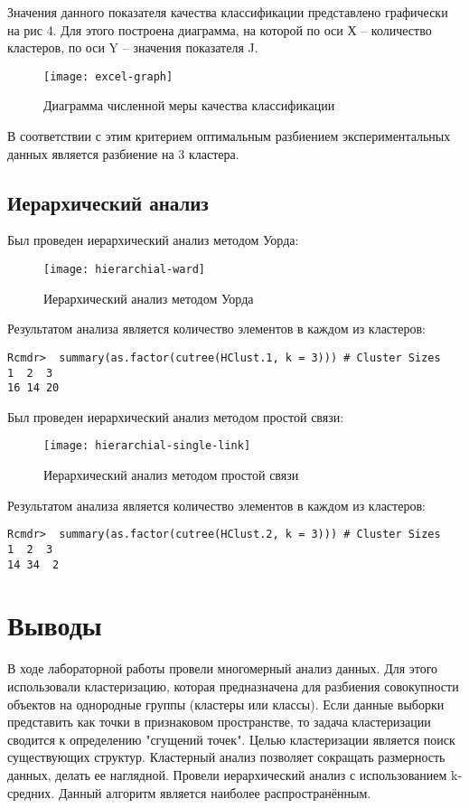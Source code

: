 \documentclass[a4paper,14pt]{extarticle}
\begin{document}
Значения данного показателя качества классификации представлено графически на
рис 4.  Для этого построена диаграмма, на которой по оси Х – количество
кластеров, по оси Y – значения показателя J.

\begin{figure}[H]
    \centering
    \texttt{[image: excel-graph]}
    \caption{Диаграмма численной меры качества классификации}
    \label{fig:excel-graph}
\end{figure}

В соответствии с этим критерием оптимальным разбиением экспериментальных данных
является разбиение на 3 кластера.

\subsection{Иерархический анализ}
Был проведен иерархический анализ методом Уорда:

\begin{figure}[H]
    \centering
    \texttt{[image: hierarchial-ward]}
    \caption{Иерархический анализ методом Уорда}
    \label{fig:hierarchial-ward}
\end{figure}

Результатом анализа является количество элементов в каждом из кластеров:

\begin{lstlisting}
Rcmdr>  summary(as.factor(cutree(HClust.1, k = 3))) # Cluster Sizes
1  2  3 
16 14 20 
\end{lstlisting}
\pagebreak

Был проведен иерархический анализ методом простой связи:

\begin{figure}[H]
    \centering
    \texttt{[image: hierarchial-single-link]}
    \caption{Иерархический анализ методом простой связи}
    \label{fig:hierarchial-single-link}
\end{figure}

Результатом анализа является количество элементов в каждом из кластеров:

\begin{lstlisting}
Rcmdr>  summary(as.factor(cutree(HClust.2, k = 3))) # Cluster Sizes
1  2  3 
14 34  2 
\end{lstlisting}

\section*{Выводы}
В ходе лабораторной работы провели многомерный анализ данных. Для этого
использовали кластеризацию, которая предназначена для разбиения совокупности
объектов на однородные группы (кластеры или классы). Если данные выборки
представить как точки в признаковом пространстве, то задача кластеризации
сводится к определению "сгущений точек". Целью кластеризации является поиск
существующих структур. Кластерный анализ позволяет сокращать размерность данных,
делать ее наглядной. Провели иерархический анализ с использованием k-средних.
Данный алгоритм является наиболее распространённым.
\end{document}

